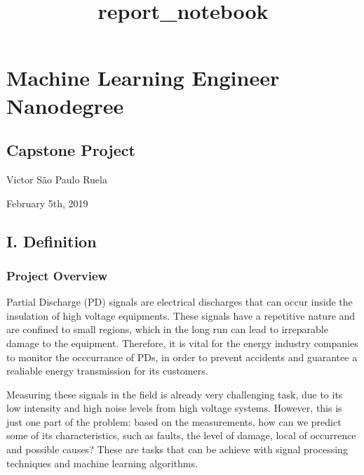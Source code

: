 \documentclass[11pt]{article}
\title{report\_notebook}
\begin{document}
    
    
    \maketitle
    
    

    
    \hypertarget{machine-learning-engineer-nanodegree}{%
\section{Machine Learning Engineer
Nanodegree}\label{machine-learning-engineer-nanodegree}}

\hypertarget{capstone-project}{%
\subsection{Capstone Project}\label{capstone-project}}

Victor São Paulo Ruela

February 5th, 2019

\hypertarget{i.-definition}{%
\subsection{I. Definition}\label{i.-definition}}

\hypertarget{project-overview}{%
\subsubsection{Project Overview}\label{project-overview}}

Partial Discharge (PD) signals are electrical discharges that can occur
inside the insulation of high voltage equipments. These signals have a
repetitive nature and are confined to small regions, which in the long
run can lead to irreparable damage to the equipment. Therefore, it is
vital for the energy industry companies to monitor the occcurrance of
PDs, in order to prevent accidents and guarantee a realiable energy
transmission for its customers.

Measuring these signals in the field is already very challenging task,
due to its low intensity and high noise levels from high voltage
systems. However, this is just one part of the problem: based on the
measurements, how can we predict some of its characteristics, such as
faults, the level of damage, local of occurrence and possible causes?
These are tasks that can be achieve with signal processing techniques
and machine learning algorithms.
\end{document}
